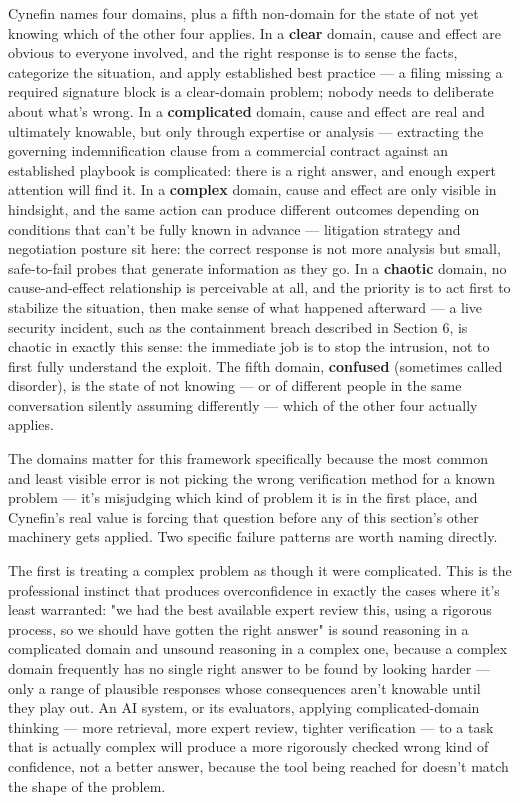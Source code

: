 Cynefin names four domains, plus a fifth non-domain for the state of not yet knowing which of the other four applies. In a \textbf{clear} domain, cause and effect are obvious to everyone involved, and the right response is to sense the facts, categorize the situation, and apply established best practice --- a filing missing a required signature block is a clear-domain problem; nobody needs to deliberate about what's wrong. In a \textbf{complicated} domain, cause and effect are real and ultimately knowable, but only through expertise or analysis --- extracting the governing indemnification clause from a commercial contract against an established playbook is complicated: there is a right answer, and enough expert attention will find it. In a \textbf{complex} domain, cause and effect are only visible in hindsight, and the same action can produce different outcomes depending on conditions that can't be fully known in advance --- litigation strategy and negotiation posture sit here: the correct response is not more analysis but small, safe-to-fail probes that generate information as they go. In a \textbf{chaotic} domain, no cause-and-effect relationship is perceivable at all, and the priority is to act first to stabilize the situation, then make sense of what happened afterward --- a live security incident, such as the containment breach described in Section 6, is chaotic in exactly this sense: the immediate job is to stop the intrusion, not to first fully understand the exploit. The fifth domain, \textbf{confused} (sometimes called disorder), is the state of not knowing --- or of different people in the same conversation silently assuming differently --- which of the other four actually applies.

The domains matter for this framework specifically because the most common and least visible error is not picking the wrong verification method for a known problem --- it's misjudging which kind of problem it is in the first place, and Cynefin's real value is forcing that question before any of this section's other machinery gets applied. Two specific failure patterns are worth naming directly.

The first is treating a complex problem as though it were complicated. This is the professional instinct that produces overconfidence in exactly the cases where it's least warranted: "we had the best available expert review this, using a rigorous process, so we should have gotten the right answer" is sound reasoning in a complicated domain and unsound reasoning in a complex one, because a complex domain frequently has no single right answer to be found by looking harder --- only a range of plausible responses whose consequences aren't knowable until they play out. An AI system, or its evaluators, applying complicated-domain thinking --- more retrieval, more expert review, tighter verification --- to a task that is actually complex will produce a more rigorously checked wrong kind of confidence, not a better answer, because the tool being reached for doesn't match the shape of the problem.

